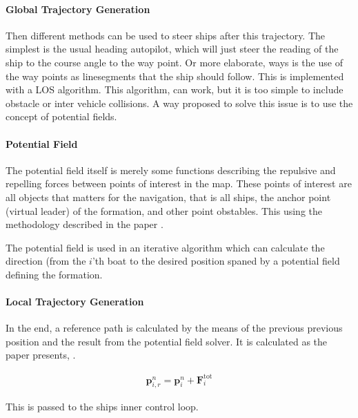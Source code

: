 \paragraph{Global Trajectory Generation}
Then different methods can be used to steer ships after this
trajectory. The simplest is the usual heading autopilot, which will
just steer the reading of the ship to the course angle to the
way point. Or more elaborate, ways is the use of the way points as
linesegments that the ship should follow. This is implemented with a
\ac{LOS} algorithm. This algorithm, can work, but it is too simple to
include obstacle or inter vehicle collisions. A way proposed to solve
this issue is to use the concept of potential fields.

\paragraph{Potential Field}
The potential field itself is merely some functions describing the
repulsive and repelling forces between points of interest in the map.
These points of interest are all objects that matters for the
navigation, that is all ships, the anchor point (virtual leader) of
the formation, and other point obstables. This using the methodology
described in the paper \citep{UAVff3dpf}.

The potential field is used in an iterative algorithm which can
calculate the direction (from the $i$'th boat to the desired position
spaned by a potential field defining the formation.

\paragraph{Local Trajectory Generation}
In the end, a reference path is calculated by the means of the
previous previous position and the result from the potential field
solver. It is calculated as the paper presents, \citep[eq.
48]{UAVff3dpf}.

\begin{align}
	\mathbf{p}_{i,r}^n = \mathbf{p}_i^n + \mathbf{F}_i ^\text{tot}
\end{align}

This is passed to the ships inner control loop.

